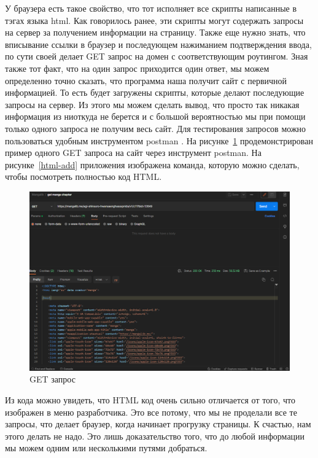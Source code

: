 У браузера есть такое свойство, что тот исполняет все скрипты написанные в тэгах языка html. 
Как говорилось ранее, эти скрипты могут содержать запросы на сервер за получением информации на страницу.
Также еще нужно знать, что вписывание ссылки в браузер и последующем нажиманием подтверждения ввода, по сути своей делает GET запрос на домен с соответствующим роутингом.
Зная также тот факт, что на один запрос приходится один ответ, мы можем определенно точно сказать, что программа наша получит сайт с первичной информацией. 
То есть будет загружены скрипты, которые делают последующие запросы на сервер.
Из этого мы можем сделать вывод, что просто так никакая информация из ниоткуда не берется и с большой вероятностью мы при помощи только одного запроса не получим весь сайт. 
Для тестирования запросов можно пользоваться удобным инструментом postman \cite{postman-cite}.
На рисунке~\ref{postman-first-get} продемонстрирован пример одного GET запроса на сайт через инструмент postman. 
На рисунке~\ref{html-add} приложения изображена команда, которую можно сделать, чтобы посмотреть полностью код HTML.

\begin{figure}
    \includegraphics[scale=0.5]{imgs/postman-get-site}
    \caption{GET запрос }
    \label{postman-first-get}
\end{figure}

Из кода можно увидеть, что HTML код очень сильно отличается от того, что изображен в меню разработчика.
Это все потому, что мы не проделали все те запросы, что делает браузер, когда начинает прогрузку страницы.
К счастью, нам этого делать не надо. Это лишь доказательство того, что до любой информации мы можем одним или несколькими путями добраться.


